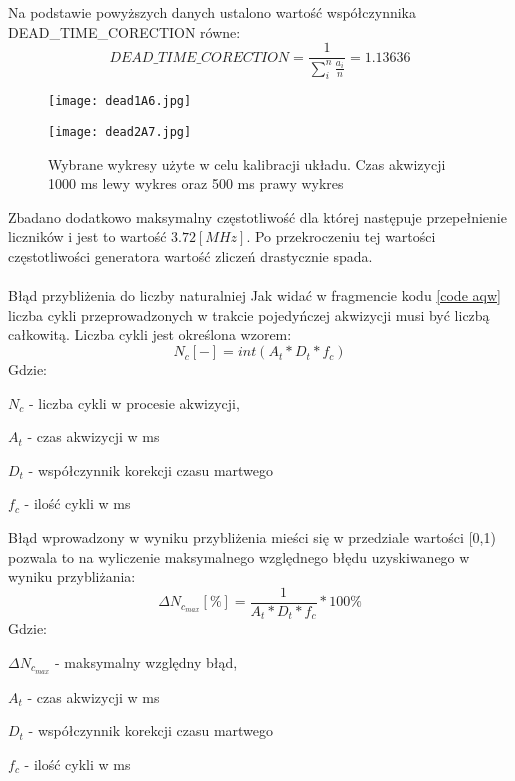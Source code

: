 Na podstawie powyższych danych ustalono wartość współczynnika DEAD\_TIME\_CORECTION równe:
\begin{equation}
        \label{dead time eq}
        DEAD\_TIME\_CORECTION = \frac{1}{\sum^n_i \frac{a_i}{n}} = 1.13636
\end{equation} 

\begin{figure}
        \centering
        \begin{multicols}{2}
                \texttt{[image: dead1A6.jpg]} \par
                \texttt{[image: dead2A7.jpg]} \par
        \end{multicols}
        \caption{Wybrane wykresy użyte w celu kalibracji układu. Czas akwizycji 1000 ms lewy wykres oraz 500 ms prawy wykres}
        \label{wykresy fit calib}
\end{figure}

Zbadano dodatkowo maksymalny częstotliwość dla której następuje przepełnienie liczników i jest to wartość $3.72 [MHz]$. Po przekroczeniu tej wartości częstotliwości generatora wartość zliczeń drastycznie spada. 

\paragraph{}{Błąd przybliżenia do liczby naturalniej}
Jak widać w fragmencie kodu \ref{code aqw} liczba cykli przeprowadzonych w trakcie pojedyńczej akwizycji musi być liczbą całkowitą. Liczba cykli jest określona wzorem:
\begin{equation}
        N_c [-] = int(A_t*D_t*f_c)
\end{equation}
Gdzie:
\begin{description}
        \item $N_c$ - liczba cykli w procesie akwizycji,
        \item $A_t$ - czas  akwizycji w ms
        \item $D_t$ - współczynnik korekcji czasu martwego 
        \item $f_c$ - ilość cykli w ms
\end{description}

Błąd wprowadzony w wyniku przybliżenia mieści się w przedziale wartości [0,1) pozwala to na wyliczenie maksymalnego względnego błędu uzyskiwanego w wyniku przybliżania:
\begin{equation}
        \Delta N_{c_{max}} [\%] = \frac{1}{A_t*D_t*f_c}  * 100\%
\end{equation} 
Gdzie:
\begin{description}
        \item $\Delta N_{c_{max}}$ - maksymalny względny błąd,
        \item $A_t$ - czas  akwizycji w ms
        \item $D_t$ - współczynnik korekcji czasu martwego 
        \item $f_c$ - ilość cykli w ms
\end{description}

